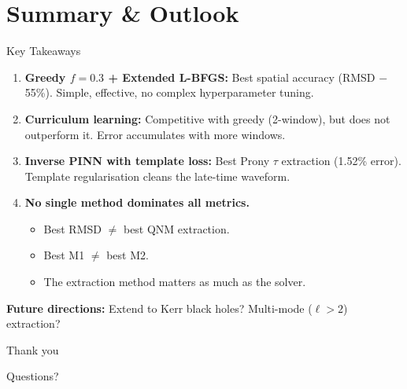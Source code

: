 \documentclass[aspectratio=169, 11pt]{beamer}
\newcommand{\bh}{black hole}
\newcommand{\qnm}{QNM}
\begin{document}
\section{Summary \& Outlook}

\begin{frame}{Key Takeaways}
  \begin{enumerate}
    \item \textbf{Greedy $f\!=\!0.3$ + Extended L-BFGS:}
          Best spatial accuracy (RMSD $-$55\%).
          Simple, effective, no complex hyperparameter tuning.

    \medskip
    \item \textbf{Curriculum learning:}
          Competitive with greedy (2-window), but does not outperform it.
          Error accumulates with more windows.

    \medskip
    \item \textbf{Inverse PINN with template loss:}
          Best Prony $\tau$ extraction (1.52\% error).
          Template regularisation cleans the late-time waveform.

    \medskip
    \item \textbf{No single method dominates all metrics.}
          \begin{itemize}
            \item Best RMSD $\neq$ best \qnm{} extraction.
            \item Best M1 $\neq$ best M2.
            \item The extraction method matters as much as the solver.
          \end{itemize}
  \end{enumerate}

  \medskip
  \textbf{Future directions:}
  Extend to Kerr \bh{}s?\;
  Multi-mode ($\ell > 2$) extraction?
\end{frame}

\begin{frame}{}
  \begin{center}
    {\Large Thank you}

    \bigskip
    Questions?
  \end{center}
\end{frame}
\end{document}
